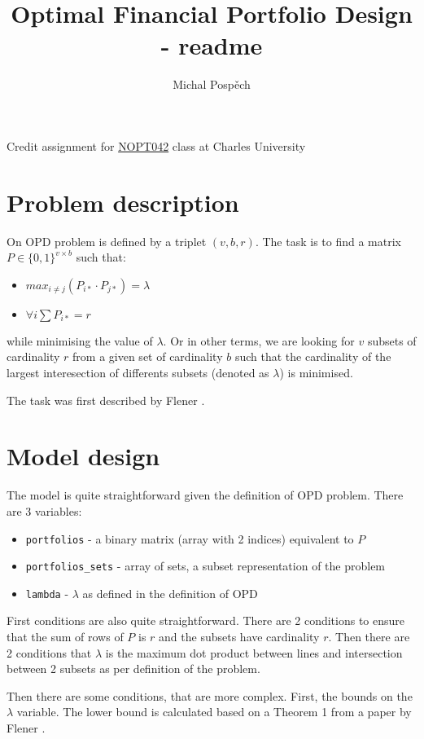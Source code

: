 \documentclass{article}
\author{Michal Pospěch}
\title{Optimal Financial Portfolio Design - readme}
\begin{document}
\maketitle
Credit assignment for \href{https://ktiml.mff.cuni.cz/~bulin/csp/}{NOPT042} class at Charles University

\section{Problem description}

On OPD problem is defined by a triplet $(v,b,r)$. The task is to find a matrix $P\in \{0,1\}^{v\times b}$ such that: \begin{itemize}
    \item $max_{i\neq j}(P_{i*}\cdot P_{j*}) = \lambda$
    \item $\forall i \sum P_{i*} = r$
\end{itemize}

while minimising the value of $\lambda$. Or in other terms, we are looking for $v$ subsets of cardinality $r$ from a given set of cardinality $b$ such that the cardinality of the largest interesection of differents subsets (denoted as $\lambda$) is minimised.

The task was first described by Flener \cite{OFPD}.

\section{Model design}
The model is quite straightforward given the definition of OPD problem. There are 3 variables:\begin{itemize}
    \item \texttt{portfolios} - a binary matrix (array with 2 indices) equivalent to $P$
    \item \texttt{portfolios\_sets} - array of sets, a subset representation of the problem
    \item \texttt{lambda} - $\lambda$ as defined in the definition of OPD
\end{itemize}


First conditions are also quite straightforward. There are 2 conditions to ensure that the sum of rows of $P$ is $r$ and the subsets have cardinality $r$. Then there are 2 conditions that $\lambda$ is the maximum dot product between lines and intersection between 2 subsets as per definition of the problem.

Then there are some conditions, that are more complex. First, the bounds on the $\lambda$ variable. The lower bound is calculated based on a Theorem 1 from a paper by Flener \cite{Design}.
\end{document}
